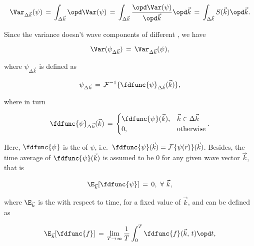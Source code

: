 \begin{equation} \label{eq:variance_k_eta}
\Var_{\Delta\vec{k}}(\psi) \,=\, \int_{\Delta\vec{k}}\opd \Var(\psi) \,=\, \int_{\Delta\vec{k}}\frac{\opd \Var(\psi)}{\opd\vec{k}}\opd\vec{k} \,=\, \int_{\Delta\vec{k}}S(\vec{k})\opd\vec{k}.
\end{equation}

Since the variance doesn't \correlate wave components of different \wavelengths, we have

\begin{equation} \label{eq:variance_k_eta_to_variance_eta_k}
\Var(\psi_{\Delta\vec{k}}) \,=\, \Var_{\Delta\vec{k}}(\psi),
\end{equation}

where $\psi_{\Delta\vec{k}}$ is defined as

\begin{equation} \label{eq:eta_k_of_fd_eta_k}
\psi_{\Delta\vec{k}} \,=\, \mathcal{F}^{-1}\{\fdfunc{\psi}_{\Delta\vec{k}}(\vec{k})\},
\end{equation}

where in turn

\begin{equation} \label{eq:fd_eta_delta_k_definition}
\fdfunc{\psi}_{\Delta\vec{k}}(\vec{k}) \,=\, \begin{cases}
\fdfunc{\psi}(\vec{k}), & \vec{k} \in \Delta\vec{k} \\
0, & \text{otherwise}
\end{cases}.
\end{equation}

Here, $\fdfunc{\psi}$ is the  of $\psi$, i.e.\ $\fdfunc{\psi}(\vec{k}) = \mathcal{F}\{\psi(\vec{r})\}(\vec{k})$. Besides, the time average of $\fdfunc{\psi}(\vec{k})$ is assumed to be 0 for any given wave vector $\vec{k}$, that is

\begin{equation} \label{eq:zero_expectation_value_reciprocal_space}
\E_{\vec{k}}[\fdfunc{\psi}] \,=\, 0,\ \forall\ \vec{k},
\end{equation}

where $\E_{\vec{k}}$ is the  with respect to time, for a fixed value of $\vec{k}$, and can be defined as

\begin{equation} \label{eq:expectation_value_reciprocal_space_with_regard_to_t_definition}
\E_{\vec{k}}[\fdfunc{f}] \,=\, \lim_{T\to\infty}\frac{1}{T}\int_0^T \fdfunc{f}(\vec{k},\,t)\opd t,
\end{equation}

